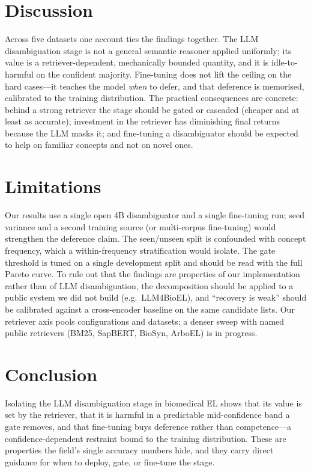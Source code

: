 \documentclass[11pt]{article}
\begin{document}
\section{Discussion}
Across five datasets one account ties the findings together. The LLM disambiguation
stage is not a general semantic reasoner applied uniformly; its value is a
retriever-dependent, mechanically bounded quantity, and it is idle-to-harmful on the
confident majority. Fine-tuning does not lift the ceiling on the hard cases---it teaches
the model \emph{when} to defer, and that deference is memorised, calibrated to the
training distribution. The practical consequences are concrete: behind a strong retriever
the stage should be gated or cascaded (cheaper and at least as accurate); investment in
the retriever has diminishing final returns because the LLM masks it; and fine-tuning a
disambiguator should be expected to help on familiar concepts and not on novel ones.

\section{Limitations}
Our results use a single open 4B disambiguator and a single fine-tuning run; seed
variance and a second training source (or multi-corpus fine-tuning) would strengthen the
deference claim. The seen/unseen split is confounded with concept frequency, which a
within-frequency stratification would isolate. The gate threshold is tuned on a single
development split and should be read with the full Pareto curve. To rule out that the
findings are properties of our implementation rather than of LLM disambiguation, the
decomposition should be applied to a public system we did not build (e.g.\ LLM4BioEL),
and ``recovery is weak'' should be calibrated against a cross-encoder baseline on the
same candidate lists. Our retriever axis pools configurations and datasets; a denser
sweep with named public retrievers (BM25, SapBERT, BioSyn, ArboEL) is in progress.

\section{Conclusion}
Isolating the LLM disambiguation stage in biomedical EL shows that its value is set by
the retriever, that it is harmful in a predictable mid-confidence band a gate removes,
and that fine-tuning buys deference rather than competence---a confidence-dependent
restraint bound to the training distribution. These are properties the field's single
accuracy numbers hide, and they carry direct guidance for when to deploy, gate, or
fine-tune the stage.
\end{document}
